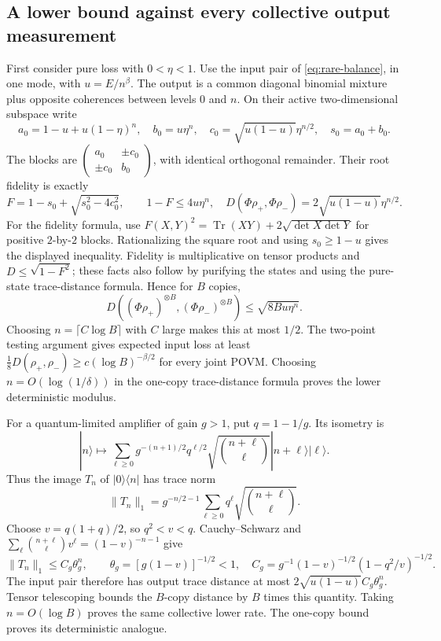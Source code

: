 \subsection{A lower bound against every collective output measurement}
First consider pure loss with $0<\eta<1$. Use the input pair of
\eqref{eq:rare-balance}, in one mode, with $u=E/n^\beta$.
The output is a common diagonal binomial mixture plus opposite coherences
between levels $0$ and $n$. On their active two-dimensional subspace write
\[
 a_0=1-u+u(1-\eta)^n,\quad b_0=u\eta^n,\quad
 c_0=\sqrt{u(1-u)}\eta^{n/2},\quad s_0=a_0+b_0.
\]
The blocks are $\left(\begin{smallmatrix}a_0&\pm c_0\\\pm c_0&b_0\end{smallmatrix}\right)$,
with identical orthogonal remainder. Their root fidelity is exactly
\[
 F=1-s_0+\sqrt{s_0^2-4c_0^2},\qquad
 1-F\le4u\eta^n,
 \quad D(\Phi\rho_+,\Phi\rho_-)=2\sqrt{u(1-u)}\eta^{n/2}.
 \tag{D.11}\label{eq:loss-fidelity}
\]
For the fidelity formula, use
$F(X,Y)^2=\operatorname{Tr}(XY)+2\sqrt{\det X\det Y}$ for positive
$2$-by-$2$ blocks. Rationalizing the square root and using $s_0\ge1-u$
gives the displayed inequality.
Fidelity is multiplicative on tensor products and
$D\le\sqrt{1-F^2}$; these facts also follow by purifying the states and
using the pure-state trace-distance formula. Hence for $B$ copies,
\[
 D((\Phi\rho_+)^{\otimes B},(\Phi\rho_-)^{\otimes B})
                   \le\sqrt{8Bu\eta^n}.
 \tag{D.12}\label{eq:loss-collective}
\]
Choosing $n=\lceil C\log B\rceil$ with $C$ large makes this at most $1/2$.
The two-point testing argument gives expected input loss at least
$\tfrac18D(\rho_+,\rho_-)\ge c(\log B)^{-\beta/2}$ for every joint POVM.
Choosing $n=O(\log(1/\delta))$ in the one-copy trace-distance formula proves
the lower deterministic modulus.

For a quantum-limited amplifier of gain $g>1$, put $q=1-1/g$.
Its isometry is
\[
 |n\rangle\mapsto\sum_{\ell\ge0}
   g^{-(n+1)/2}q^{\ell/2}\sqrt{\binom{n+\ell}{\ell}}
                    |n+\ell\rangle|\ell\rangle.
\]
Thus the image $T_n$ of $|0\rangle\langle n|$ has trace norm
\[
 \|T_n\|_1=g^{-n/2-1}\sum_{\ell\ge0}q^\ell
                               \sqrt{\binom{n+\ell}{\ell}}.
\]
Choose $v=q(1+q)/2$, so $q^2<v<q$. Cauchy--Schwarz and
$\sum_\ell\binom{n+\ell}{\ell}v^\ell=(1-v)^{-n-1}$ give
\[
 \|T_n\|_1\le C_g\theta_g^n,\qquad
 \theta_g=[g(1-v)]^{-1/2}<1,
 \quad C_g=g^{-1}(1-v)^{-1/2}(1-q^2/v)^{-1/2}.
 \tag{D.13}\label{eq:amplifier-cross}
\]
The input pair therefore has output trace distance at most
$2\sqrt{u(1-u)}C_g\theta_g^n$. Tensor telescoping bounds the $B$-copy
distance by $B$ times this quantity. Taking $n=O(\log B)$ proves the same
collective lower rate. The one-copy bound proves its deterministic analogue.

